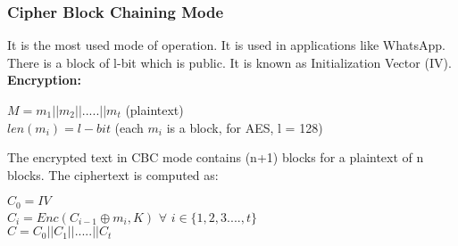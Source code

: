 \documentclass[11pt]{article}
\begin{document}
\subsubsection*{Cipher Block Chaining Mode}
It is the most used mode of operation. It is used in applications like WhatsApp. There is a block of l-bit which is public. It is known as Initialization Vector (IV).\\
\newline
\textbf{Encryption:}
\begin{center}
    $M = m_1 || m_2 || ..... || m_t$ (plaintext)\\
    $len(m_i) = l-bit$ (each $m_i$ is a block, for AES, l = 128)\\
\end{center}
The encrypted text in CBC mode contains (n+1) blocks for a plaintext of n blocks. The ciphertext is computed as:
\begin{center}
    $C_0 = IV$\\
    $C_i = Enc(C_{i-1} \oplus m_i, K)$ $\forall$ $i \in \{1,2,3....,t\}$\\
    $C = C_0 || C_1 || ..... || C_t$
\end{center}
\end{document}
